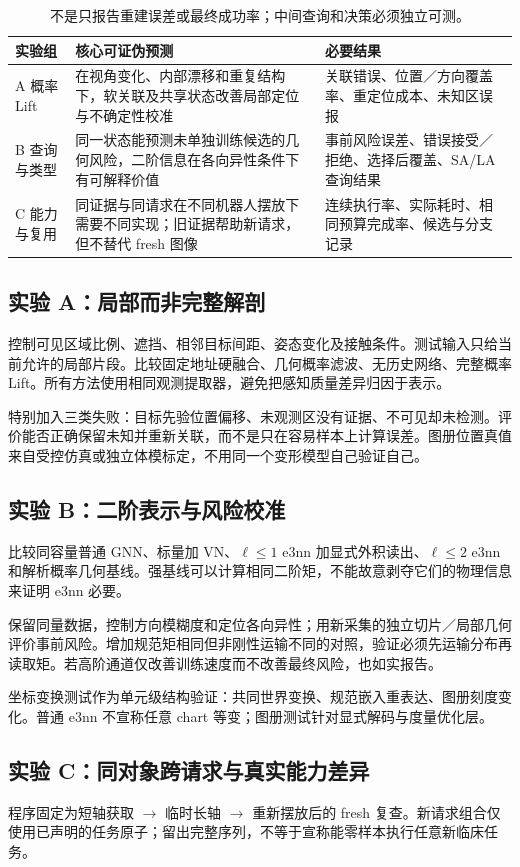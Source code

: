 \documentclass[UTF8,fontset=fandol,11pt,a4paper]{ctexart}
\theoremstyle{plain}
\theoremstyle{definition}
\theoremstyle{remark}
\numberwithin{equation}{section}
\begin{document}
\begin{table}[htbp]\centering\small
\begin{tabularx}{\linewidth}{P{22mm}YY}\toprule
实验组 & 核心可证伪预测 & 必要结果\\\midrule
A 概率 Lift & 在视角变化、内部漂移和重复结构下，软关联及共享状态改善局部定位与不确定性校准 & 关联错误、位置／方向覆盖率、重定位成本、未知区误报\\
B 查询与类型 & 同一状态能预测未单独训练候选的几何风险，二阶信息在各向异性条件下有可解释价值 & 事前风险误差、错误接受／拒绝、选择后覆盖、SA/LA 查询结果\\
C 能力与复用 & 同证据与同请求在不同机器人摆放下需要不同实现；旧证据帮助新请求，但不替代 fresh 图像 & 连续执行率、实际耗时、相同预算完成率、候选与分支记录\\\bottomrule
\end{tabularx}
\caption{不是只报告重建误差或最终成功率；中间查询和决策必须独立可测。}
\end{table}

\subsection{实验 A：局部而非完整解剖}
控制可见区域比例、遮挡、相邻目标间距、姿态变化及接触条件。测试输入只给当前允许的局部片段。比较固定地址硬融合、几何概率滤波、无历史网络、完整概率 Lift。所有方法使用相同观测提取器，避免把感知质量差异归因于表示。

特别加入三类失败：目标先验位置偏移、未观测区没有证据、不可见却未检测。评价能否正确保留未知并重新关联，而不是只在容易样本上计算误差。图册位置真值来自受控仿真或独立体模标定，不用同一个变形模型自己验证自己。

\subsection{实验 B：二阶表示与风险校准}
比较同容量普通 GNN、标量加 VN、$\ell\le1$ e3nn 加显式外积读出、$\ell\le2$ e3nn 和解析概率几何基线。强基线可以计算相同二阶矩，不能故意剥夺它们的物理信息来证明 e3nn 必要。

保留同量数据，控制方向模糊度和定位各向异性；用新采集的独立切片／局部几何评价事前风险。增加规范矩相同但非刚性运输不同的对照，验证必须先运输分布再读取矩。若高阶通道仅改善训练速度而不改善最终风险，也如实报告。

坐标变换测试作为单元级结构验证：共同世界变换、规范嵌入重表达、图册刻度变化。普通 e3nn 不宣称任意 chart 等变；图册测试针对显式解码与度量优化层。

\subsection{实验 C：同对象跨请求与真实能力差异}
程序固定为短轴获取 $\to$ 临时长轴 $\to$ 重新摆放后的 fresh 复查。新请求组合仅使用已声明的任务原子；留出完整序列，不等于宣称能零样本执行任意新临床任务。
\end{document}

